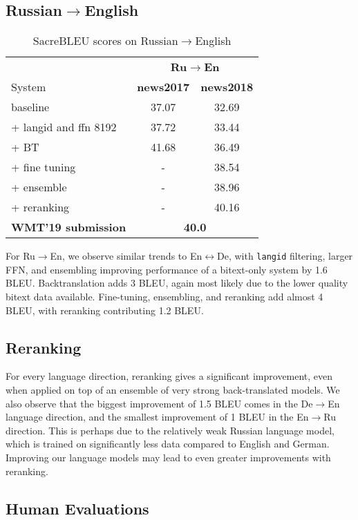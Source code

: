 \documentclass[11pt,a4paper]{article}
\newcommand{\detoen}{De$\rightarrow$En}
\newcommand{\entoru}{En$\rightarrow$Ru}
\newcommand{\rutoen}{Ru$\rightarrow$En}
\newcommand{\enbide}{En$\leftrightarrow$De}
\begin{document}
\subsection{Russian$\rightarrow$English}
\begin{table}[t]
\centering
\begin{tabular}{lcc}
\toprule
& \multicolumn{2}{c}{\textbf{\rutoen{}}} \\
System & \bf news2017 & \bf news2018 \\ \midrule
baseline & 37.07 & 32.69 \\ 
+ langid and ffn 8192 & 37.72 & 33.44 \\
+ BT & 41.68 & 36.49 \\
+ fine tuning & - & 38.54 \\
+ ensemble & - & 38.96 \\
+ reranking & -  & 40.16 \\
\midrule
\bf WMT'19 submission & \multicolumn{2}{c}{\bf 40.0} \\ 
\bottomrule
\end{tabular}
\caption{SacreBLEU scores on Russian$\rightarrow$English }
\label{tab:ablation_ruen}
\end{table}

For \rutoen{}, we observe similar trends to \enbide{}, with \texttt{langid} filtering, larger FFN, and ensembling improving performance of a bitext-only system by 1.6 BLEU.
Backtranslation adds 3 BLEU, again most likely due to the lower quality bitext data available.
Fine-tuning, ensembling, and reranking add almost 4 BLEU, with reranking contributing 1.2 BLEU.

\subsection{Reranking}
For every language direction, reranking gives a significant improvement, even when applied on top of an ensemble of very strong back-translated models. 
We also observe that the biggest improvement of 1.5 BLEU comes in the \detoen{} language direction, and the smallest improvement of 1 BLEU in the \entoru{} direction.
This is perhaps due to the relatively weak Russian language model, which is trained on significantly less data compared to English and German.
Improving our language models may lead to even greater improvements with reranking.


\subsection{Human Evaluations}
\end{document}
